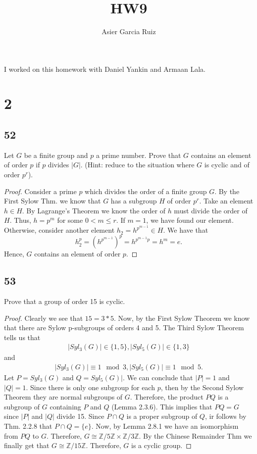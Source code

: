 \documentclass{article}
\title{HW9}
\author{Asier Garcia Ruiz}
\newcommand{\Z}{\mathbb{Z}}
\newcommand{\ZmodnZ}[1]{\Z / #1 \Z}
\newenvironment{hwproof}[1]
{
    #1
    \begin{proof}
}{
    \end{proof}
}
\begin{document}
\maketitle

I worked on this homework with Daniel Yankin and Armaan Lala.
\section*{2}
\subsection*{52}
\begin{hwproof}
    {
        Let $G$ be a finite group and $p$ a prime number. Prove that $G$ contains
        an element of order $p$ if $p$ divides $|G|$. (Hint: reduce to the
        situation where $G$ is cyclic and of order $p^r$).
    }
    Consider a prime $p$ which divides the order of a finite group $G$. By the 
    First Sylow Thm. we know that $G$ has a subgroup $H$ of order $p^r$.
    Take an element $h \in H$. By Lagrange's Theorem we know the order of $h$
    must divide the order of $H$. Thus, $h = p^m$ for some $0 < m \leq r$.
    If $m = 1$, we have found our element. Otherwise, consider another 
    element $h_2 = h^{p^{m-1}} \in H$. We have that 
    \begin{equation*}
        h_2^p = (h^{p^{m-1}})^p = h^{p^{m-1}p} = h^m = e.
    \end{equation*}
    Hence, $G$ contains an element of order $p$.
\end{hwproof}

\subsection*{53}
\begin{hwproof}
    {
        Prove that a group of order 15 is cyclic.
    }
    Clearly we see that $15=3*5$. Now, by the First Sylow Theorem we know
    that there are Sylow p-subgroups of orders 4 and 5. The Third Sylow Theorem
    tells us that
    \begin{gather*}
        |Syl_3(G)| \in \{1, 5\},
        |Syl_5(G)| \in \{1, 3\}
    \end{gather*}
    and
    \begin{gather*}
        |Syl_3(G)| \equiv 1 \mod 3,
        |Syl_5(G)| \equiv 1 \mod 5.
    \end{gather*}
    Let $P = Syl_3(G)$ and $Q = Syl_5(G)|$.
    We can conclude that $|P| = 1$ and $|Q| = 1$. Since there is
    only one subgroup for each $p$, then by the Second Sylow Theorem they are
    normal subgroups of $G$. Therefore, the product $PQ$ is a subgroup of
    $G$ containing $P$ and $Q$ (Lemma 2.3.6). This implies that
    $PQ = G$ since $|P|$ and $|Q|$ divide 15. Since $P \cap Q$ is a proper
    subgroup of $Q$, ir follows by Thm. 2.2.8 that $P\cap Q = \{e\}$.
    Now, by Lemma 2.8.1 we have an isomorphism from $PQ$ to $G$.
    Therefore, $G \cong \ZmodnZ{5} \times \ZmodnZ{3}$. By the Chinese Remainder
    Thm we finally get that $G \cong \ZmodnZ{15}$. Therefore, $G$ is a
    cyclic group.

\end{hwproof}
\end{document}
